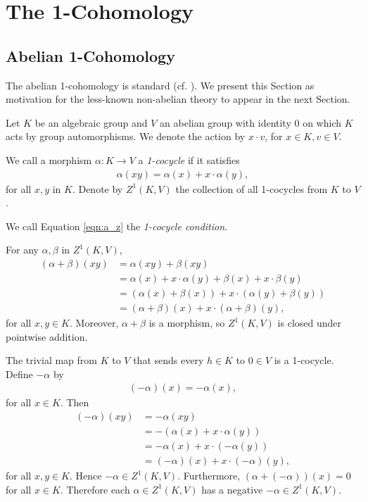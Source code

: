 
\chapter{The 1-Cohomology}
\label{Chapter3}

\section{Abelian 1-Cohomology}
The abelian 1-cohomology is standard (cf. \cite{brown1976cohomology}). We present this Section as motivation for the less-known non-abelian theory to appear in the next Section.

Let $K$ be an algebraic group and $V$ an abelian group with identity $0$ on which $K$ acts by group automorphisms. We denote the action by $x \cdot v$, for $x \in K, v \in V$.

\begin{definition} We call a morphism $\alpha: K\rightarrow V$ a \emph{1-cocycle} if it satisfies
	\begin{align}
		\alpha(xy) = \alpha(x) + x\cdot\alpha(y),
		\label{eqn:a_z}
	\end{align}
	for all $x, y$ in $K$. Denote by $Z^1\left( K, V \right)$ the collection of all 1-cocycles from $K$ to $V$.

	We call Equation \ref{eqn:a_z} the \emph{1-cocycle condition}.
\end{definition}

For any $\alpha, \beta$ in $Z^1\left(K, V\right)$,
\begin{align*}
	\left(\alpha + \beta\right)(xy) &=  \alpha(xy) +  \beta(xy) \\
	&=  \alpha(x) + x\cdot\alpha(y) +  \beta(x) + x\cdot\beta(y)\\
	&=  \left( \alpha(x) + \beta(x) \right) + x\cdot\left(\alpha(y) + \beta(y)\right) \\
	&=  \left(\alpha+\beta\right)(x) + x\cdot\left(\alpha + \beta\right)(y),
\end{align*}
for all $x,y \in K$. Moreover, $\alpha + \beta$ is a morphism, so $Z^1(K, V)$ is closed under pointwise addition.

The trivial map from $K$ to $V$ that sends every $h \in K$ to $0 \in V$ is a 1-cocycle. 
Define $-\alpha$ by
\begin{align*}
	(-\alpha)(x) = -\alpha(x),
\end{align*}
for all $x \in K$. Then
\begin{align*}
	(-\alpha)(xy) &= -\alpha(xy) \\
		&= -\left(\alpha(x) + x \cdot \alpha(y)\right) \\
		&= -\alpha(x) + x\cdot (-\alpha(y)) \\
		&= (-\alpha)(x) + x \cdot (-\alpha)(y),
\end{align*}
for all $x,y \in K$. Hence $-\alpha \in Z^1(K, V)$. Furthermore, $(\alpha + (-\alpha))(x) = 0$ for all $x \in K$. Therefore each $\alpha \in Z^1(K, V)$ has a negative $-\alpha\in Z^1(K, V)$.

